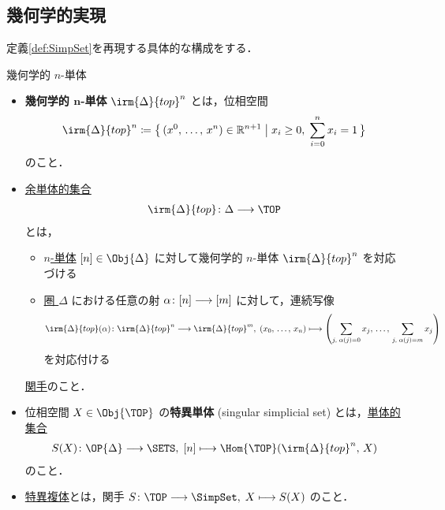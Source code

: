 \documentclass[TQFT_main]{subfiles}
\begin{document}
\subsection{幾何学的実現}

定義\ref{def:SimpSet}を再現する具体的な構成をする．

\begin{mydef}[label=def:simplicial-top,breakable]{幾何学的 $n$-単体}
    \begin{itemize}
        \item \textbf{幾何学的 $\bm{n}$-単体} $\irm{\Delta}{top}^n$ とは，位相空間
        \begin{align}
            \irm{\Delta}{top}^n \coloneqq \bigl\{\, (x^0,\, \dots,\, x^n) \in \mathbb{R}^{n+1}\bigm| x_i \ge 0,\; \sum_{i=0}^n x_i = 1 \,\bigr\} 
        \end{align}
        のこと．
        \item \hyperref[def:SimpSet]{余単体的集合} 
        \begin{align}
            \irm{\Delta}{top} \colon \Delta \lto \TOP
        \end{align}
        とは，
        \begin{itemize}
            \item \hyperref[def:simplex-cat]{$n$-単体} $[n] \in \Obj{\Delta}$ に対して幾何学的 $n$-単体 $\irm{\Delta}{top}^n$ を対応づける
            \item \hyperref[def:simplex-cat]{圏 $\Delta$} における任意の射 $\alpha \colon [n] \longrightarrow [m]$ に対して，連続写像
            \begin{align}
                \irm{\Delta}{top}(\alpha) \colon \irm{\Delta}{top}^n \lto \irm{\Delta}{top}^m,\; (x_0,\, \dots,\, x_n) \lmto \left( \sum_{j,\; \alpha(j) = 0} x_j,\, \dots ,\, \sum_{j,\; \alpha(j) = m} x_j \right) 
            \end{align}
            を対応付ける
        \end{itemize}
        \hyperref[def:functor]{関手}のこと．
        \item 位相空間 $X \in \Obj{\TOP}$ の\textbf{特異単体} (singular simplicial set) とは，\hyperref[def:SimpSet]{単体的集合}
        \begin{align}
            S(X) \colon \OP{\Delta} \lto \SETS,\; [n] \lmto \Hom{\TOP} (\irm{\Delta}{top}^n ,\, X)
        \end{align}
        のこと．
        \item \hyperref[def:simplicial-top]{特異複体}とは，関手 $S \colon \TOP \lto \SimpSet,\; X \lmto S(X)$ のこと．
    \end{itemize}
    
\end{mydef}
\end{document}
